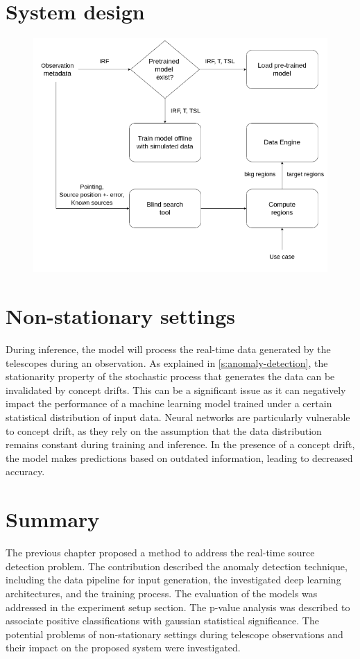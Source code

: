 \section{System design}
\label{s:system-design}

\begin{figure}[!htb]
\centering
\includegraphics[width=\linewidth]{figures/method/systemdesign1.png}
\caption{ }
\label{fig:system-design-1}
\end{figure}

\section{Non-stationary settings}
\label{s:non-stationary-settings}
During inference, the model will process the real-time data generated by the telescopes during an observation. As explained in \autoref{s:anomaly-detection}, the stationarity property of the stochastic process that generates the data can be invalidated by concept drifts. This can be a significant issue as it can negatively impact the performance of a machine learning model trained under a certain statistical distribution of input data. Neural networks are particularly vulnerable to concept drift, as they rely on the assumption that the data distribution remains constant during training and inference. In the presence of a concept drift, the model makes predictions based on outdated information, leading to decreased accuracy. 





\section{Summary}
The previous chapter proposed a method to address the real-time source detection problem. The contribution described the anomaly detection technique, including the data pipeline for input generation, the investigated deep learning architectures, and the training process. The evaluation of the models was addressed in the experiment setup section. The p-value analysis was described to associate positive classifications with gaussian statistical significance. The potential problems of non-stationary settings during telescope observations and their impact on the proposed system were investigated.